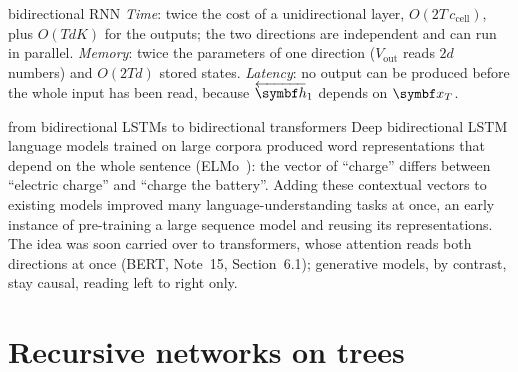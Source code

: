 \documentclass[11pt]{article}
\newcommand{\hv}{\vect{h}}
\begin{document}
\begin{runtime}{bidirectional RNN}
\emph{Time}: twice the cost of a unidirectional layer, $O(2T\,c_{\mathrm{cell}})$, plus $O(TdK)$ for the outputs; the two
directions are independent and can run in parallel. \emph{Memory}: twice the parameters of one direction ($V_{\mathrm{out}}$
reads $2d$ numbers) and $O(2Td)$ stored states. \emph{Latency}: no output can be produced before the whole input has been
read, because $\overleftarrow{\hv}_1$ depends on $\x_T$.
\end{runtime}

\begin{modern}{from bidirectional LSTMs to bidirectional transformers}
Deep bidirectional LSTM language models trained on large corpora produced word representations that depend on the
whole sentence (ELMo~\cite{peters2018}): the vector of ``charge'' differs between ``electric charge'' and ``charge the
battery''. Adding these contextual vectors to existing models improved many language-understanding tasks at once,
an early instance of pre-training a large sequence model and reusing its representations. The idea was soon carried over
to transformers, whose attention reads both directions at once (BERT, Note~15, Section~6.1); generative models, by contrast, stay
causal, reading left to right only.
\end{modern}

\section{Recursive networks on trees}\label{sec:recursive}
\end{document}
